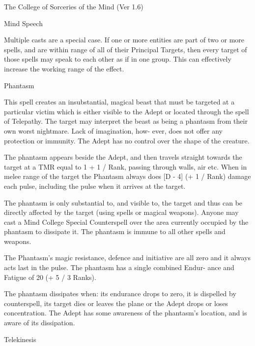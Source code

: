 \begin{Chapter}{The College of Sorceries of the Mind (Ver 1.6)}
\begin{spell}[S-5]{Mind Speech }
\begin{effects}
Multiple casts are a special case.  If one or more entities are part
of two or more spells, and are within range of all of their Principal
Targets, then every target of those spells may speak to each other as
if in one group. This can effectively increase the working range of
the effect.
\end{effects}
\end{spell}

\begin{spell}[S-6]{Phantasm }

\begin{effects}
This spell creates an insubstantial, magical beast that must be
targeted at a particular victim which is either visible to the Adept
or located through the spell of Telepathy.  The target may interpret
the beast as being a phantasm from their own worst nightmare.  Lack of
imagination, how- ever, does not offer any protection or immunity.
The Adept has no control over the shape of the creature.

The phantasm appears beside the Adept, and then travels straight
towards the target at a TMR equal to 1 + 1 / Rank, passing through
walls, air etc.  When in melee range of the target the Phantasm always
does [D - 4] (+ 1 / Rank) damage each pulse, including the pulse when
it arrives at the target.

The phantasm is only substantial to, and visible to, the target and
thus can be directly affected by the target (using spells or magical
weapons).  Anyone may cast a Mind College Special Counterspell over
the area currently occupied by the phantasm to dissipate it.  The
phantasm is immune to all other spells and weapons.

The Phantasm’s magic resistance, defence and initiative are all zero
and it always acts last in the pulse. The phantasm has a single
combined Endur- ance and Fatigue of 20 (+ 5 / 3 Ranks).

The phantasm dissipates when: its endurance drops to zero, it is
dispelled by counterspell, its target dies or leaves the plane or the
Adept drops or loses concentration.  The Adept has some awareness of
the phantasm’s location, and is aware of its dissipation.
\end{effects}
\end{spell}

\begin{spell}[S-7]{Telekinesis }


\end{spell}
\end{Chapter}
